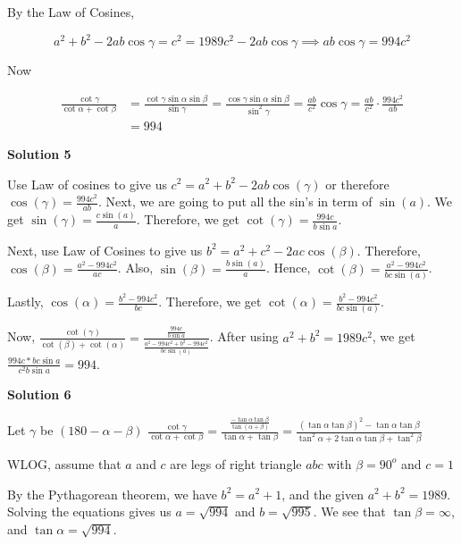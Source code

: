 \begin{enumerate}
 By the Law of Cosines,

 
 \[a^2 + b^2 - 2ab\cos{\gamma} = c^2 = 1989c^2 - 2ab\cos{\gamma} \implies ab\cos{\gamma} = 994c^2\]

 Now

 
 \begin{align*}\frac {\cot{\gamma}}{\cot{\alpha} + \cot{\beta}} &= \frac {\cot{\gamma}\sin{\alpha}\sin{\beta}}{\sin{\gamma}} = \frac {\cos{\gamma}\sin{\alpha}\sin{\beta}}{\sin^2{\gamma}} = \frac {ab}{c^2}\cos{\gamma} = \frac {ab}{c^2} \cdot \frac {994c^2}{ab}\\ &= \boxed{994}\end{align*}





\textbf{Solution 5}

Use Law of cosines to give us $c^2=a^2+b^2-2ab\cos(\gamma)$ or therefore $\cos(\gamma)=\frac{994c^2}{ab}$.  Next, we are going to put all the sin's in term of $\sin(a)$.  We get $\sin(\gamma)=\frac{c\sin(a)}{a}$.  Therefore, we get $\cot(\gamma)=\frac{994c}{b\sin a}$.

 Next, use Law of Cosines to give us $b^2=a^2+c^2-2ac\cos(\beta)$.  Therefore, $\cos(\beta)=\frac{a^2-994c^2}{ac}$.  Also, $\sin(\beta)=\frac{b\sin(a)}{a}$.  Hence, $\cot(\beta)=\frac{a^2-994c^2}{bc\sin(a)}$.  

 Lastly, $\cos(\alpha)=\frac{b^2-994c^2}{bc}$. Therefore, we get $\cot(\alpha)=\frac{b^2-994c^2}{bc\sin(a)}$.

 Now, $\frac{\cot(\gamma)}{\cot(\beta)+\cot(\alpha)}=\frac{\frac{994c}{b\sin a}}{\frac{a^2-994c^2+b^2-994c^2}{bc\sin(a)}}$.  After using $a^2+b^2=1989c^2$, we get $\frac{994c*bc\sin a}{c^2b\sin a}=\boxed{994}$.

 


 



\textbf{Solution 6}

Let $\gamma$ be $(180-\alpha-\beta)$
$\frac{\cot \gamma}{\cot \alpha+\cot \beta} = \frac{\frac{-\tan \alpha \tan \beta}{\tan(\alpha+\beta)}}{\tan \alpha + \tan \beta} = \frac{(\tan \alpha \tan \beta)^2-\tan \alpha \tan \beta}{\tan^2 \alpha + 2\tan \alpha \tan \beta +\tan^2 \beta}$

 WLOG, assume that $a$ and $c$ are legs of right triangle $abc$ with $\beta = 90^o$ and $c=1$

 By the Pythagorean theorem, we have $b^2=a^2+1$, and the given $a^2+b^2=1989$. Solving the equations gives us $a=\sqrt{994}$ and $b=\sqrt{995}$. We see that $\tan \beta = \infty$, and $\tan \alpha = \sqrt{994}$. 


\end{enumerate}
